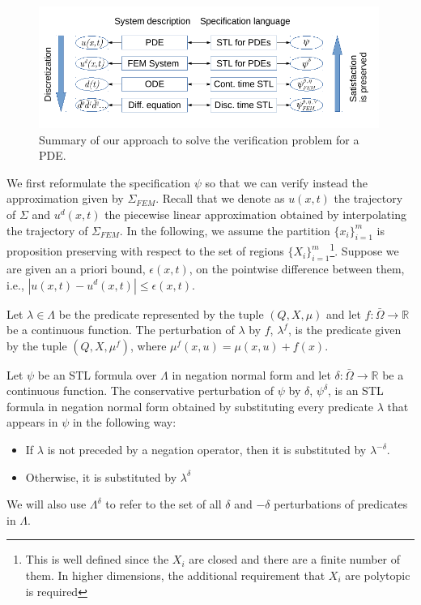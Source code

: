 \documentclass[oribibl]{llncs/llncs}
\newcommand*{\R}{\mathbb{R}}
\begin{document}
\begin{figure}[!t]
    \centering 
        \includegraphics[width=0.99\textwidth]{diagram.png}
    \caption{Summary of our approach to solve the verification problem for a
    PDE.}
    \label{fig:diagram}
\end{figure}


We first reformulate the specification $\psi$ so that we can verify instead the
approximation given by $\Sigma_{FEM}$. Recall that we denote as $u(x,t)$ the
trajectory of $\Sigma$ and $u^d(x, t)$ the piecewise linear approximation
obtained by interpolating the trajectory of $\Sigma_{FEM}$. In the following, we
assume the partition $\{x_i\}_{i=1}^m$ is proposition preserving with respect 
to the set of
regions $\{X_i\}_{i = 1}^{m}$\footnote{This is well defined since the $X_i$ are
closed and there are a finite number of them. In higher dimensions, the
additional requirement that $X_i$ are polytopic is required}. Suppose we are given
an a priori bound, $\epsilon(x, t)$, on the pointwise difference between them, i.e., 
$|u(x, t) - u^d(x, t)| \leq \epsilon(x, t)$.

\begin{definition}
\label{def:m_perturbation}
    Let $\lambda \in \Lambda$ be the predicate represented by the tuple $(Q, X,
    \mu)$ and let $f : \bar\Omega \to \R$ be a continuous function. The perturbation of
    $\lambda$ by $f$, $\lambda^f$, is the predicate given by the tuple $(Q, X,
    \mu^f)$, where $\mu^f(x, u) = \mu(x, u) + f(x)$.
\end{definition}

\begin{definition}
\label{def:delta_perturbation}
    Let $\psi$ be an STL formula over $\Lambda$ in negation normal form 
    and let $\delta : \bar\Omega \to \R$ be a continuous function. The
    conservative perturbation of $\psi$ by $\delta$, $\psi^\delta$, is an STL
    formula in negation normal form obtained by substituting every predicate
    $\lambda$ that appears in $\psi$ in the following way:

    \begin{itemize}
        \item If $\lambda$ is not preceded by a negation operator, then it is
            substituted by $\lambda^{-\delta}$.
        \item Otherwise, it is substituted by $\lambda^{\delta}$
    \end{itemize}

    We will also use $\Lambda^{\delta}$ to refer to the set of all $\delta$ and
    $-\delta$
    perturbations of predicates in $\Lambda$.
\end{definition}
\end{document}
